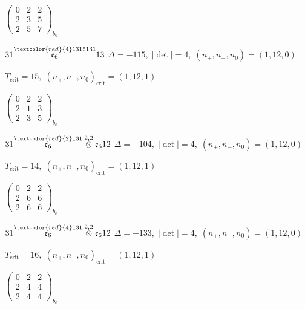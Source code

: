 \documentclass[10pt]{article}
\begin{document}
\hspace{2em}$\left(\begin{smallmatrix}0 & 2 & 2 \\ 2 & 3 & 5 \\ 2 & 5 & 7\end{smallmatrix}\right)_{\!b_0}$

$31\overset{\textcolor{red}{4}1315131}{\mathfrak{e}_6}13$ \quad $\Delta=-115,\; |\det|=4,\; (n_+,n_-,n_0)=(1,12,0)$

\hspace{1em}$T_{\text{crit}}=15,\; (n_+,n_-,n_0)_{\text{crit}}=(1,12,1)$

\hspace{2em}$\left(\begin{smallmatrix}0 & 2 & 2 \\ 2 & 1 & 3 \\ 2 & 3 & 5\end{smallmatrix}\right)_{\!b_0}$

\smallskip

$31\overset{\textcolor{red}{2}131}{\mathfrak{e}_6}\overset{2,2}{\otimes}\mathfrak{e}_612$ \quad $\Delta=-104,\; |\det|=4,\; (n_+,n_-,n_0)=(1,12,0)$

\hspace{1em}$T_{\text{crit}}=14,\; (n_+,n_-,n_0)_{\text{crit}}=(1,12,1)$

\hspace{2em}$\left(\begin{smallmatrix}0 & 2 & 2 \\ 2 & 6 & 6 \\ 2 & 6 & 6\end{smallmatrix}\right)_{\!b_0}$

$31\overset{\textcolor{red}{4}131}{\mathfrak{e}_6}\overset{2,2}{\otimes}\mathfrak{e}_612$ \quad $\Delta=-133,\; |\det|=4,\; (n_+,n_-,n_0)=(1,12,0)$

\hspace{1em}$T_{\text{crit}}=16,\; (n_+,n_-,n_0)_{\text{crit}}=(1,12,1)$

\hspace{2em}$\left(\begin{smallmatrix}0 & 2 & 2 \\ 2 & 4 & 4 \\ 2 & 4 & 4\end{smallmatrix}\right)_{\!b_0}$

\smallskip
\end{document}
